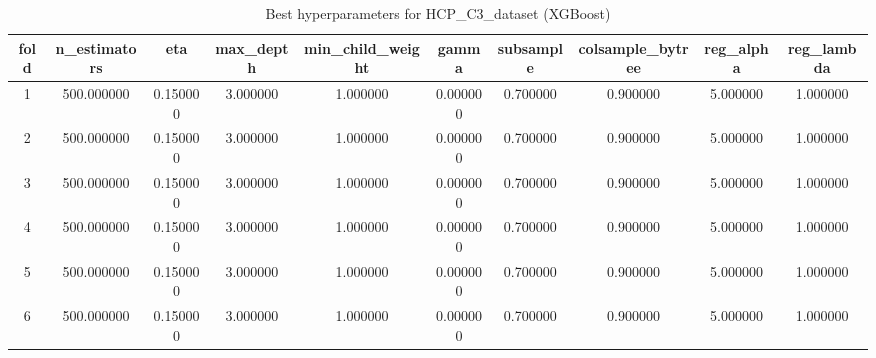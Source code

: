 \begin{table}[htbp]
\caption{Best hyperparameters for HCP_C3_dataset (XGBoost)}
\label{tab:best_hyperparams_HCP_C3_dataset}
\begin{tabular}{cccccccccc}
\toprule
fold & n_estimators & eta & max_depth & min_child_weight & gamma & subsample & colsample_bytree & reg_alpha & reg_lambda \\
\midrule
1 & 500.000000 & 0.150000 & 3.000000 & 1.000000 & 0.000000 & 0.700000 & 0.900000 & 5.000000 & 1.000000 \\
2 & 500.000000 & 0.150000 & 3.000000 & 1.000000 & 0.000000 & 0.700000 & 0.900000 & 5.000000 & 1.000000 \\
3 & 500.000000 & 0.150000 & 3.000000 & 1.000000 & 0.000000 & 0.700000 & 0.900000 & 5.000000 & 1.000000 \\
4 & 500.000000 & 0.150000 & 3.000000 & 1.000000 & 0.000000 & 0.700000 & 0.900000 & 5.000000 & 1.000000 \\
5 & 500.000000 & 0.150000 & 3.000000 & 1.000000 & 0.000000 & 0.700000 & 0.900000 & 5.000000 & 1.000000 \\
6 & 500.000000 & 0.150000 & 3.000000 & 1.000000 & 0.000000 & 0.700000 & 0.900000 & 5.000000 & 1.000000 \\
\bottomrule
\end{tabular}
\end{table}
